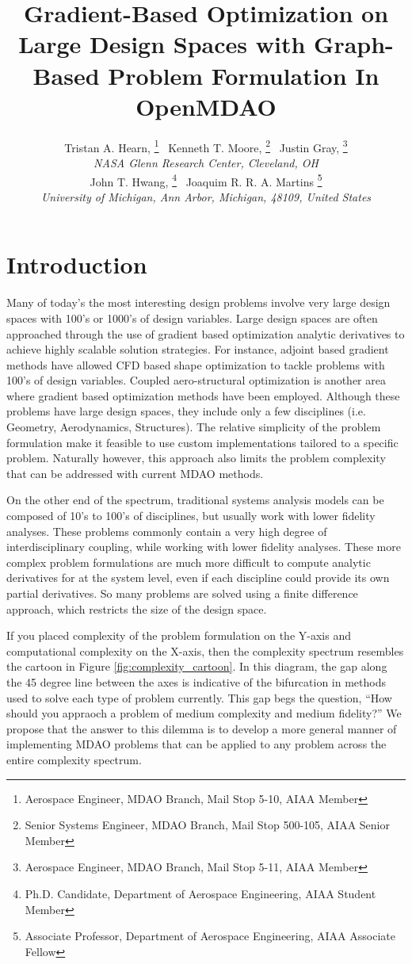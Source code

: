 \documentclass[]{aiaa-tc} %
\title{Gradient-Based Optimization on Large Design Spaces with Graph-Based Problem Formulation In OpenMDAO}
\author{
  Tristan A. Hearn,%
     \thanks{Aerospace Engineer, MDAO Branch, Mail Stop 5-10, AIAA Member}
  \ Kenneth T. Moore,%
     \thanks{Senior Systems Engineer, MDAO Branch, Mail Stop 500-105, AIAA Senior Member}
  \ Justin Gray,%
     \thanks{Aerospace Engineer, MDAO Branch, Mail Stop 5-11, AIAA Member}
   \\
  {\normalsize\itshape
  NASA Glenn Research Center, Cleveland, OH}  \\
  John T. Hwang,%
  \thanks{Ph.D. Candidate, Department of Aerospace Engineering, AIAA Student Member}
  \ Joaquim R. R. A. Martins%
  \thanks{Associate Professor, Department of Aerospace Engineering, AIAA Associate Fellow}
  \\
  {\normalsize\itshape
   University of Michigan, Ann Arbor, Michigan, 48109, United States}
}
\begin{document}
  \maketitle

  \begin{abstract}

  \end{abstract}

  \section{Introduction}

    Many of today's the most interesting design problems involve very large design spaces with 100's or 1000's of
    design variables. Large design spaces are often approached through the use of gradient based optimization
    analytic derivatives to achieve highly scalable solution strategies. For instance, adjoint based gradient
    methods have allowed CFD based shape optimization to tackle problems with 100's of design variables\cite{SU2_2013}.
    Coupled aero-structural optimization is another area where gradient based optimization methods have
    been employed\cite{Kenway2012c, Haghighat:2011:ADO}. Although these problems have large design spaces,
    they include only a few disciplines (i.e. Geometry, Aerodynamics, Structures). The relative simplicity of
    the problem formulation make it feasible to use custom implementations tailored to a specific problem. Naturally however,
    this approach also limits the problem complexity that can be addressed with current MDAO methods.

    On the other end of the spectrum, traditional systems analysis models can be composed of 10's to 100's of disciplines,
    but usually work with lower fidelity analyses. These problems commonly contain a very high degree of interdisciplinary
    coupling, while working with lower fidelity analyses. These more complex problem formulations are much more difficult to compute
    analytic derivatives for at the system level, even if each discipline could provide its own partial derivatives. So many
    problems are solved using a finite difference approach, which restricts the size of the design space.

    If you placed complexity of the problem formulation on the Y-axis and computational complexity on the X-axis, then
    the complexity spectrum resembles the cartoon in Figure \ref{fig:complexity_cartoon}.
    In this diagram, the gap along the 45 degree line between the axes is indicative of the bifurcation
    in methods used to solve each type of problem currently. This gap begs the
    question, ``How should you appraoch a problem of medium complexity and medium fidelity?''
    We propose that the answer to this dilemma is to develop a more general manner of
    implementing MDAO problems that can be applied to any problem across the entire complexity spectrum.
\end{document}
